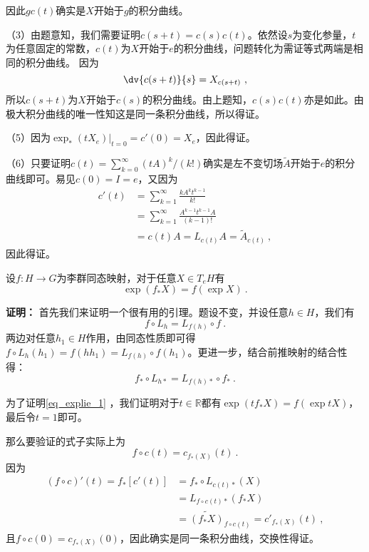 因此$gc(t)$确实是$X$开始于$g$的积分曲线。


（3）由题意知，我们需要证明$c(s+t)=c(s)c(t)$。依然设$s$为变化参量，$t$为任意固定的常数，$c(t)$为$X$开始于$e$的积分曲线，问题转化为需证等式两端是相同的积分曲线。
因为
\begin{equation}
\dv{c(s+t)}{s}=X_{c(s+t)}~,
\end{equation}
所以$c(s+t)$为$X$开始于$c(s)$的积分曲线。由上题知，$c(s)c(t)$亦是如此。由极大积分曲线的唯一性知这是同一条积分曲线，所以得证。


（5）因为$\exp_*(tX_e)|_{t=0}=c'(0)=X_e$，因此得证。

（6）只要证明$c(t)=\sum^{\infty}_{k=0}(tA)^k/(k!)$确实是左不变切场$\widetilde A$开始于$e$的积分曲线即可。易见$c(0)=I=e$，又因为
\begin{equation}
\begin{aligned}
c'(t)&=\sum_{k=1}^\infty\frac{kA^kt^{k-1}}{k!}\\
&=\sum_{k=1}^\infty\frac{A^{k-1}t^{k-1}A}{(k-1)!}\\
&=c(t)A=L_{c(t)}A=\widetilde A_{c(t)}~,
\end{aligned}
\end{equation}
因此得证。

\begin{theorem}{}\label{the_explie_1}
设$f:H\to G$为李群同态映射，对于任意$X\in T_e H$有
\begin{equation}\label{eq_explie_1}
\exp(f_*X)=f(\exp X)~.
\end{equation}
\end{theorem}
\textbf{证明：}
首先我们来证明一个很有用的引理。题设不变，并设任意$h\in H$，我们有
\begin{equation}
f\circ L_{h}=L_{f(h)}\circ f~.
\end{equation}
两边对任意$h_1\in H$作用，由同态性质即可得$f\circ L_h(h_1)=f(hh_1)=L_{f(h)}\circ f(h_1)$。更进一步，结合前推映射的结合性得：
\begin{equation}
f_*\circ L_{h*}=L_{f(h)*}\circ f_*~.
\end{equation}

为了证明\autoref{eq_explie_1} ，我们证明对于$t\in \mathbb R$都有$\exp (tf_*X)=f(\exp tX)$，最后令$t=1$即可。

那么要验证的式子实际上为
\begin{equation}
f\circ c(t)=c_{f_*(X)}(t)~.
\end{equation}
因为
\begin{equation}
\begin{aligned}
(f\circ c)'(t)=f_*[c'(t)]&=f_*\circ L_{c(t)*}(X)\\
&=L_{f\circ c(t)*}(f_*X)\\&=\widetilde {(f_*X)}_{f\circ c(t)}=c'_{f_*(X)}(t)~,
\end{aligned}
\end{equation}
且$f\circ c(0)=c_{f_*(X)}(0)$，因此确实是同一条积分曲线，交换性得证。
